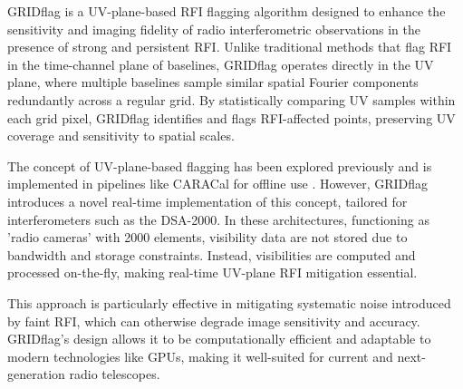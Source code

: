 GRIDflag \citep{10464448} is a UV-plane-based RFI flagging algorithm designed to enhance the sensitivity and imaging fidelity of radio interferometric observations in the presence of strong and persistent RFI. Unlike traditional methods that flag RFI in the time-channel plane of baselines, GRIDflag operates directly in the UV plane, where multiple baselines sample similar spatial Fourier components redundantly across a regular grid. By statistically comparing UV samples within each grid pixel, GRIDflag identifies and flags RFI-affected points, preserving UV coverage and sensitivity to spatial scales.

The concept of UV-plane-based flagging has been explored previously and is implemented in pipelines like CARACal for offline use \citep{jozsa2020caracal}. However, GRIDflag introduces a novel real-time implementation of this concept, tailored for interferometers such as the DSA-2000. In these architectures, functioning as 'radio cameras' with 2000 elements, visibility data are not stored due to bandwidth and storage constraints. Instead, visibilities are computed and processed on-the-fly, making real-time UV-plane RFI mitigation essential.

This approach is particularly effective in mitigating systematic noise introduced by faint RFI, which can otherwise degrade image sensitivity and accuracy. GRIDflag's design allows it to be computationally efficient and adaptable to modern technologies like GPUs, making it well-suited for current and next-generation radio telescopes.

